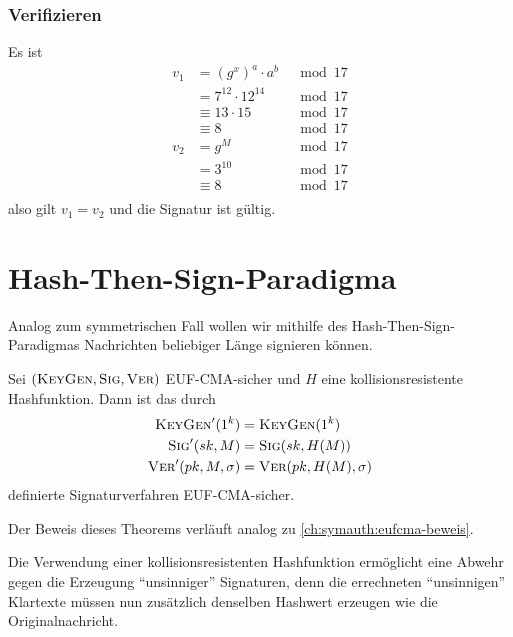 \subsubsection*{Verifizieren} Es ist
\begin{align*} 
  v_1 & = (g^x)^a \cdot a^b & \mod 17 \\
      & = 7^{12} \cdot 12^{14} & \mod 17 \\ 
      & \equiv 13 \cdot 15 & \mod 17 \\
      & \equiv 8 & \mod 17 \\
  v_2 & = g^M & \mod 17 \\ 
      &= 3^{10} & \mod 17\\ 
      &\equiv 8 & \mod 17\\
\end{align*} 
also gilt $v_1=v_2$ und die Signatur ist gültig.
\section{Hash-Then-Sign-Paradigma}\indexHashSign 
Analog zum symmetrischen Fall wollen wir mithilfe des
Hash-Then-Sign-Paradigmas Nachrichten beliebiger Länge signieren können.
\begin{theorem} Sei $(\textsc{KeyGen}, \textsc{Sig},
  \textsc{Ver})$ EUF-CMA-sicher und $H$ eine kollisionsresistente
  Hashfunktion. Dann ist das durch
  \begin{align*} 
    \textsc{KeyGen}'(1^k) &= \textsc{KeyGen}(1^k)\\
    \textsc{Sig}'(sk,M) &= \textsc{Sig}(sk,H(M))\\
    \textsc{Ver}'(pk,M,\sigma) &= \textsc{Ver}(pk,H(M),\sigma)
  \end{align*} definierte Signaturverfahren EUF-CMA-sicher.
\end{theorem}

Der Beweis dieses Theorems verläuft analog zu
\ref{ch:symauth:eufcma-beweis}.

Die Verwendung einer kollisionsresistenten Hashfunktion ermöglicht
eine Abwehr gegen die Erzeugung "`unsinniger"' Signaturen, denn die
errechneten "`unsinnigen"' Klartexte müssen nun zusätzlich denselben
Hashwert erzeugen wie die Originalnachricht.


